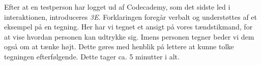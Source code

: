 Efter at en testperson har logget ud af Codecademy, som det sidste led i interaktionen, introduceres \textit{3E}. Forklaringen foregår verbalt og understøttes af et eksempel på en tegning.  Her har vi tegnet et ansigt på vores tændstikmand, for at vise hvordan personen kan udtrykke sig.  Imens personen tegner beder vi dem også om at tænke højt. Dette gøres med henblik på lettere at kunne tolke tegningen efterfølgende. Dette tager ca. 5 minutter i alt. 
